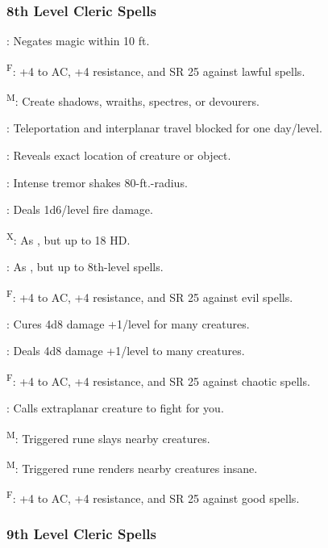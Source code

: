 \subsubsection{8th Level Cleric Spells}

: Negates magic within 10 ft.

\textsuperscript{F}: +4 to AC, +4 resistance, and SR 25 against lawful spells.

\textsuperscript{M}: Create shadows, wraiths, spectres, or devourers.

: Teleportation and interplanar travel blocked for one day/level.

: Reveals exact location of creature or object.

: Intense tremor shakes 80-ft.-radius.

: Deals 1d6/level fire damage.

\textsuperscript{X}: As , but up to 18 HD.

: As , but up to 8th-level spells.

\textsuperscript{F}: +4 to AC, +4 resistance, and SR 25 against evil spells.

: Cures 4d8 damage +1/level for many creatures.

: Deals 4d8 damage +1/level to many creatures.

\textsuperscript{F}: +4 to AC, +4 resistance, and SR 25 against chaotic spells.

: Calls extraplanar creature to fight for you.

\textsuperscript{M}: Triggered rune slays nearby creatures.

\textsuperscript{M}: Triggered rune renders nearby creatures insane.

\textsuperscript{F}: +4 to AC, +4 resistance, and SR 25 against good spells.

\subsubsection{9th Level Cleric Spells}

